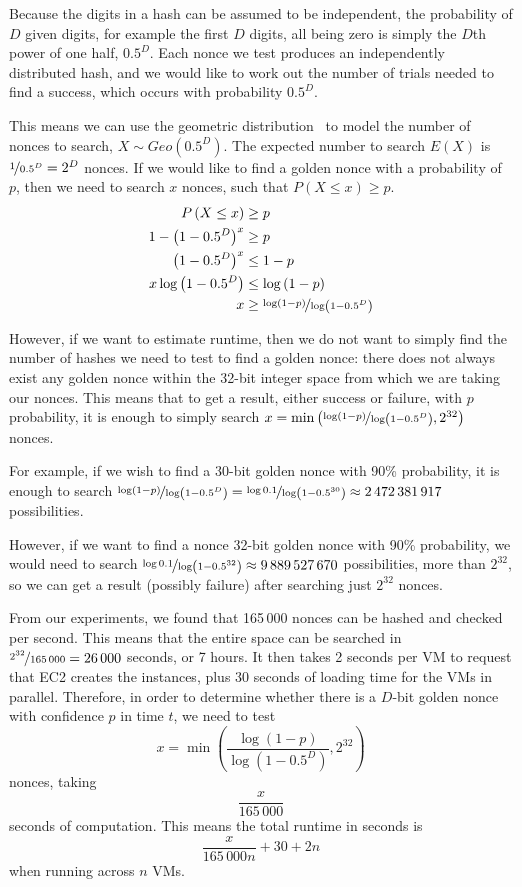 \documentclass[letterpaper,twocolumn,11pt]{article}
\begin{document}
Because the digits in a hash can be assumed to be independent, the probability of $D$ given digits, for example the first $D$ digits, all being zero is simply the $D$th power of one half, $0.5^D$. Each nonce we test produces an independently distributed hash, and we would like to work out the number of trials needed to find a success, which occurs with probability $0.5^D$.

This means we can use the geometric distribution~\cite{geometric} to model the number of nonces to search, $X \sim Geo\left(0.5^D\right)$. The expected number to search $E\left(X\right)$ is $\nicefrac{1}{0.5^D} = 2^D$ nonces. If we would like to find a golden nonce with a probability of $p$, then we need to search $x$ nonces, such that $P\left(X\leq x\right) \geq p$.
\begin{align*}
    P\left(X\leq x\right) &\geq p \\
    1-\left(1-0.5^D\right)^x &\geq p \\
    \left(1-0.5^D\right)^x &\leq 1-p \\
    x\log\left(1-0.5^D\right) &\leq \log\left(1-p\right) \\
    x &\geq \nicefrac{\log\left(1-p\right)}{\log\left(1-0.5^D\right)} \\
\end{align*}

However, if we want to estimate runtime, then we do not want to simply find the number of hashes we need to test to find a golden nonce: there does not always exist any golden nonce within the 32-bit integer space from which we are taking our nonces. This means that to get a result, either success or failure, with $p$ probability, it is enough to simply search $x = \min\left(\nicefrac{\log\left(1-p\right)}{\log\left(1-0.5^D\right)}, 2^{32}\right)$ nonces.

For example, if we wish to find a 30-bit golden nonce with 90\% probability, it is enough to search $\nicefrac{\log\left(1-p\right)}{\log\left(1-0.5^D\right)} = \nicefrac{\log0.1}{\log\left(1-0.5^{30}\right)} \approx 2\,472\,381\,917$ possibilities.

However, if we want to find a nonce 32-bit golden nonce with 90\% probability, we would need to search $\nicefrac{\log0.1}{\log\left(1-0.5^{32}\right)} \approx 9\,889\,527\,670$ possibilities, more than $2^{32}$, so we can get a result (possibly failure) after searching just $2^{32}$ nonces.

From our experiments, we found that 165\,000 nonces can be hashed and checked per second. This means that the entire space can be searched in $\nicefrac{2^{32}}{165\,000} = 26\,000$ seconds, or 7 hours. It then takes 2 seconds per VM to request that EC2 creates the instances, plus 30 seconds of loading time for the VMs in parallel. Therefore, in order to determine whether there is a $D$-bit golden nonce with confidence $p$ in time $t$, we need to test $$x = \min\left(\frac{\log\left(1-p\right)}{\log\left(1-0.5^D\right)},2^{32}\right)$$ nonces, taking $$\frac{x}{165\,000}$$ seconds of computation. This means the total runtime in seconds is $$\frac{x}{165\,000n}+30+2n$$ when running across $n$ VMs.
\end{document}
